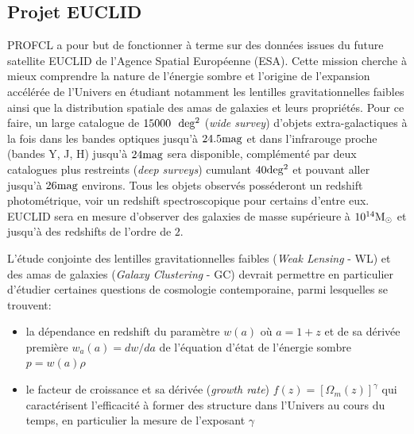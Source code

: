 \documentclass[a4paper,11pt]{article}
\numberwithin{equation}{section}
\begin{document}
  \subsection{Projet EUCLID}
    PROFCL a pour but de fonctionner à terme sur des données issues du future satellite EUCLID de l'Agence Spatial Européenne (ESA). Cette mission cherche à mieux comprendre la nature de l'énergie sombre et l'origine de l'expansion accélérée de l'Univers en étudiant notamment les lentilles gravitationnelles faibles ainsi que la distribution spatiale des amas de galaxies et leurs propriétés.\newline
    Pour ce faire, un large catalogue de $15000 \ \ \rm{deg^2}$ (\textit{wide survey}) d'objets extra-galactiques à la fois dans les bandes optiques jusqu'à $24.5 \rm{mag}$ et dans l'infrarouge proche (bandes Y, J, H) jusqu'à $24 \rm{mag}$ sera disponible, complémenté par deux catalogues plus restreints (\textit{deep surveys}) cumulant $40\rm{deg^2}$ et pouvant aller jusqu'à $26 \rm{mag}$ environs\cite{EUCLID}. Tous les objets observés posséderont un redshift photométrique, voir un redshift spectroscopique pour certains d'entre eux. EUCLID sera en mesure d'observer des galaxies de masse supérieure à $10^{14} \rm{M_{\odot}}$ et jusqu'à des redshifts de l'ordre de $2$.\par
    L'étude conjointe des lentilles gravitationnelles faibles (\textit{Weak Lensing} - WL) et des amas de galaxies (\textit{Galaxy Clustering} - GC) devrait permettre en particulier d'étudier certaines questions de cosmologie contemporaine, parmi lesquelles se trouvent\cite{EUCLID_BIBLE}:
    \begin{itemize}
      \item la dépendance en redshift du paramètre $w(a)$ où $a = 1 + z$ et de sa dérivée première $w_a (a) = dw/da$ de l'équation d'état de l'énergie sombre $p = w(a) \rho$
      \item le facteur de croissance et sa dérivée (\textit{growth rate}) $f(z) = [ \Omega_m (z) ]^{\gamma}$ qui caractérisent l'efficacité à former des structure dans l'Univers au cours du temps, en particulier la mesure de l'exposant $\gamma$
    \end{itemize}
  
\end{document}
